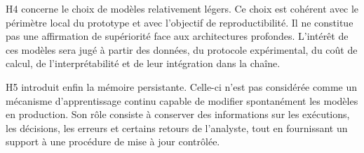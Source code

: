 H4 concerne le choix de modèles relativement légers. Ce choix est cohérent avec le périmètre local du prototype et avec l'objectif de reproductibilité. Il ne constitue pas une affirmation de supériorité face aux architectures profondes. L'intérêt de ces modèles sera jugé à partir des données, du protocole expérimental, du coût de calcul, de l'interprétabilité et de leur intégration dans la chaîne.

H5 introduit enfin la mémoire persistante. Celle-ci n'est pas considérée comme un mécanisme d'apprentissage continu capable de modifier spontanément les modèles en production. Son rôle consiste à conserver des informations sur les exécutions, les décisions, les erreurs et certains retours de l'analyste, tout en fournissant un support à une procédure de mise à jour contrôlée.
